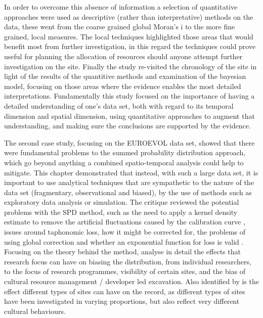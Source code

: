 In order to overcome this absence of information a selection of quantitative approaches were used as descriptive (rather than interpretative) methods on the data, these went from the coarse grained global Moran's i to the more fine grained, local measures. The local techniques highlighted those areas that would benefit most from further investigation, in this regard the techniques could prove useful for planning the allocation of resources should anyone attempt further investigation on the site. Finally the study re-visited the chronology of the site in light of the results of the quantitive methods and examination of the bayesian model, focusing on those areas where the evidence enables the most detailed interpretations. Fundamentally this study focused on the importance of having a detailed understanding of one's data set, both with regard to its temporal dimension and spatial dimension, using quantitative approaches to augment that understanding, and making sure the conclusions are supported by the evidence.

The second case study, focusing on the EUROEVOL data set, showed that there were fundamental problems to the summed probability distribution approach, which go beyond anything a combined spatio-temporal analysis could help to mitigate. This chapter demonstrated that instead, with such a large data set, it is important to use analytical techniques that are sympathetic to the nature of the data set (fragmentary, observational and biased), by the use of methods such as exploratory data analysis or simulation. The critique reviewed the potential problems with the SPD method, such as the need to apply a kernel density estimate to remove the artificial fluctuations caused by the calibration curve \citep{BROWN2015133}, issues around taphonomic loss, how it might be corrected for, the problems of using global correction and whether an exponential function for loss is valid \citep{SUROVELL20071868, SUROVELL20091715, Williams2012578, BALLENGER20111314}. Focusing on the theory behind the method, \citet{BALLENGER20111314, McLaughlin2016, Torfing2015193} analyse in detail the effects that research focus can have on biasing the distribution, from individual researchers, to the focus of research programmes, visibility of certain sites, and the bias of cultural resource management / developer led excavation. Also identified by \citet{McLaughlin2016,Torfing2015193} is the effect different types of sites can have on the record, as different types of sites have been investigated in varying proportions, but also reflect very different cultural behaviours.
 
